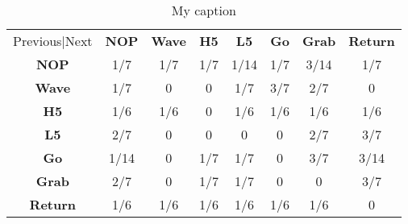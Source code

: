 \begin{table}[]
\centering
\begin{tabular}{cccccccc}
Previous|Next                        & \textbf{NOP} & \textbf{Wave} & \textbf{H5} & \textbf{L5} & \textbf{Go} & \textbf{Grab} & \textbf{Return} \\ \cline{2-8} 
\multicolumn{1}{c|}{\textbf{NOP}}    & 1/7          & 1/7           & 1/7         & 1/14        & 1/7         & 3/14          & 1/7             \\
\multicolumn{1}{c|}{\textbf{Wave}}   & 1/7          & 0             & 0           & 1/7         & 3/7         & 2/7           & 0               \\
\multicolumn{1}{c|}{\textbf{H5}}     & 1/6          & 1/6           & 0           & 1/6         & 1/6         & 1/6           & 1/6             \\
\multicolumn{1}{c|}{\textbf{L5}}     & 2/7          & 0             & 0           & 0           & 0           & 2/7           & 3/7             \\
\multicolumn{1}{c|}{\textbf{Go}}     & 1/14         & 0             & 1/7         & 1/7         & 0           & 3/7           & 3/14            \\
\multicolumn{1}{c|}{\textbf{Grab}}   & 2/7          & 0             & 1/7         & 1/7         & 0           & 0             & 3/7             \\
\multicolumn{1}{c|}{\textbf{Return}} & 1/6          & 1/6           & 1/6         & 1/6         & 1/6         & 1/6           & 0              
\end{tabular}
\caption{My caption}
\label{my-label}
\end{table}